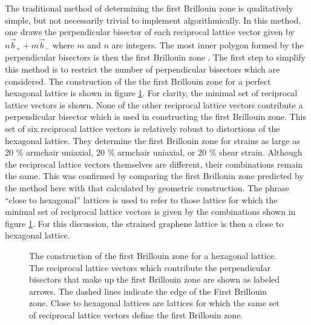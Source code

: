 The traditional method of determining the first Brillouin zone is qualitatively simple, but not necessarily trivial to implement algorithmically.
In this method, one draws the perpendicular bisector of each reciprocal lattice vector given by $n \vec{b}_+ + m \vec{b}_-$ where $m$ and $n$ are integers.
The most inner polygon formed by the perpendicular bisectors is then the first Brillouin zone \cite{Kittel2005}.
The first step to simplify this method is to restrict the number of perpendicular bisectors which are considered.
The construction of the the first Brillouin zone for a perfect hexagonal lattice is shown in figure \ref{fig:sBZ:BZ}.
For clarity, the minimal set of reciprocal lattice vectors is shown.
None of the other reciprocal lattice vectors contribute a perpendicular bisector which is used in constructing the first Brillouin zone.
This set of six reciprocal lattice vectors is relatively robust to distortions of the hexagonal lattice.
They determine the first Brillouin zone for strains as large as 20 \% armchair uniaxial, 20 \% armchair uniaxial, or 20 \% shear strain.
Although the reciprocal lattice vectors themselves are different, their combinations remain the same.
This was confirmed by comparing the first Brillouin zone predicted by the method here with that calculated by geometric construction.
The phrase ``close to hexagonal'' lattices is used to refer to those lattice for which the minimal set of reciprocal lattice vectors is given by the combinations shown in figure \ref{fig:sBZ:BZ}.
For this discussion, the strained graphene lattice is then a close to hexagonal lattice.

\begin{figure}
	\begin{center}
	
	\end{center}
	\caption[The construction of the first Brillouin zone for a hexagonal lattice]{\label{fig:sBZ:BZ} The construction of the first Brillouin zone for a hexagonal lattice.  The reciprocal lattice vectors which contribute the perpendicular bisectors that make up the first Brillouin zone are shown as labeled arrows. The dashed lines indicate the edge of the First Brillouin zone.  Close to hexagonal lattices are lattices for which the same set of reciprocal lattice vectors define the first Brillouin zone.}
\end{figure}

